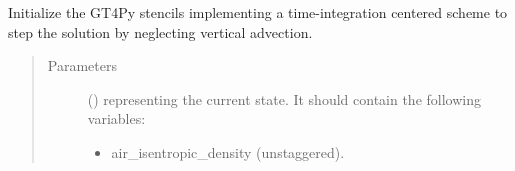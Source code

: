 \documentclass[letterpaper,10pt,english]{sphinxmanual}
\begin{document}
\begin{fulllineitems}
\begin{fulllineitems}
\begin{quote}
\begin{description}
\begin{itemize}
\end{itemize}

\end{description}\end{quote}

\end{fulllineitems}


\begin{fulllineitems}
\label{\detokenize{api:dycore.prognostic_isentropic_nonconservative_centered.PrognosticIsentropicNonconservativeCentered._stencils_stepping_by_neglecting_vertical_advection_initialize}}
Initialize the GT4Py stencils implementing a time-integration centered scheme to step the solution
by neglecting vertical advection.
\begin{quote}\begin{description}
\item[{Parameters}] \leavevmode
{} () \textendash{} 
{\hyperref[\detokenize{api:storages.state_isentropic.StateIsentropic}]{}} representing the current state.
It should contain the following variables:
\begin{itemize}
\item {} 
air\_isentropic\_density (unstaggered).

\end{itemize}


\end{description}\end{quote}

\end{fulllineitems}



\end{fulllineitems}
\end{document}
